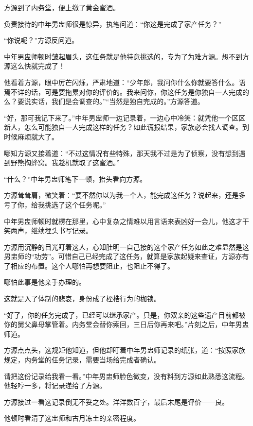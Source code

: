 
\begin{this_body}

方源到了内务堂，便上缴了黄金蜜酒。

负责接待的中年男盅师很是惊异，执笔问道：“你这是完成了家产任务？”

“你说呢？”方源反问道。

中年男盅师顿时皱起眉头，这任务就是他特意挑选的，专为了为难方源。想不到方源这么快就完成了！

他看着方源，眼中厉芒闪烁，严肃地道：“少年郎，我问你什么你就要答什么。语焉不详的话，可是要拖累对你的评价的。我来问你，你这任务是你独自一人完成的么？要说实话，我们是会调查的。”“当然是独自完成的。”方源答道。

“好，那可我记下来了。”中年男盅师一边记录着，一边心中冷笑：就凭他一个区区新人，怎么可能独自一人完成这样的任务？如此谎报结果，家族必会找人调查。到时候麻烦就大了。

哪知方源又接着道：“不过这情况有些特殊，那天我不过是为了侦察，没有想到遇到野熊掏蜂窝。我趁机就取了这蜜酒。”

“什么？”中年男盅师笔下一顿，抬头看向方源。

方源耸耸肩，微笑着：“要不然你以为我一个人，能完成这任务？说起来，还是多亏了你，给我挑选了这个任务呢。”

中年男盅师顿时就楞在那里，心中复杂之情难以用言语来表凶好一会儿，他这才干笑两声，继续埋头书写记录。

方源用沉静的目光盯着这人，心知肚明一自己接的这个家产任务如此之难显然是这男盅师的“功劳”。可惜自己已经完成了这任务，就算是家族起疑来查证，方源亦有了相应的布置。这个人哪怕再想要阻止，也阻止不得了。

哪怕此事是他亲手办理的。

这就是入了体制的悲哀，身份成了桎梏行为的枷锁。

“好了，你的任务完成了，已经可以继承家产。只是，你双亲的这些遗产目前都被你的舅父鼻母掌管着。内务堂会替你索回，三日后你再来吧。”片刻之后，中年男盅师道。

方源点点头，这规矩他知道，但他却盯着中年男盅师记录的纸张，道：“按照家族规定，内务堂的任务记录，需要当场给完成者确认。

请把这份记录给我看一看。”中年男盅师脸色微变，没有料到方源如此熟悉这流程。他轻哼一多，将记录递给了方源。

方源接过一看这记录倒无不妥之处。洋洋数百字，最后末尾是评价——良。

他顿时看清了这盅师和古月冻土的亲密程度。


\end{this_body}
